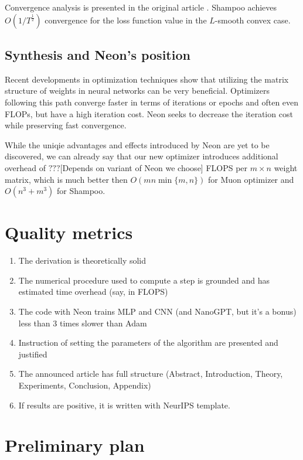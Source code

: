 \documentclass[]{scrartcl}
\begin{document}
Convergence analysis is presented in the original article \cite{gupta2018shampoopreconditionedstochastictensor}. Shampoo achieves $O(1/T^{\frac{1}{2}})$ convergence for the loss function value in the $L$-smooth convex case.

\subsection{Synthesis and Neon's position}

Recent developments in optimization techniques show that utilizing the matrix structure of weights in neural networks can be very beneficial. Optimizers following this path converge faster in terms of iterations or epochs and often even FLOPs, but have a high iteration cost. Neon seeks to decrease the iteration cost while preserving fast convergence.

While the uniqie advantages and effects introduced by Neon are yet to be discovered, we can already say that our new optimizer introduces additional overhead of $???$[Depends on variant of Neon we choose] FLOPS per $m \times n$ weight matrix, which is much better then $O(m n \min\{m, n\})$ for Muon optimizer and $O(n^3 + m^3)$ for Shampoo. 

\section{Quality metrics}
\begin{enumerate}
    \item The derivation is theoretically solid
    \item The numerical procedure used to compute a step is grounded and has estimated time overhead (say, in FLOPS)
    \item The code with Neon trains MLP and CNN (and NanoGPT, but it's a bonus) less than 3 times slower than Adam
    \item Instruction of setting the parameters of the algorithm are presented and justified
    \item The announced article has full structure (Abstract, Introduction, Theory, Experiments, Conclusion, Appendix)
    \item If results are positive, it is written with NeurIPS template.
\end{enumerate}

\section{Preliminary plan}
\end{document}
